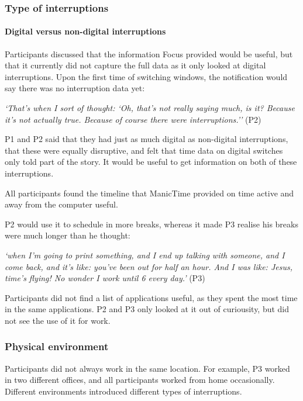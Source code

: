 \subsubsection{Type of interruptions}
\paragraph{Digital versus non-digital interruptions}

Participants discussed that the information Focus provided would be useful, but that it currently did not capture the full data as it only looked at digital interruptions. Upon the first time of switching windows, the notification would say there was no interruption data yet: 

\textit{`That's when I sort of thought: `Oh, that's not really saying much, is it? Because it's not actually true. Because of course there were interruptions.''} (P2)

P1 and P2 said that they had just as much digital as non-digital interruptions, that these were equally disruptive, and felt that time data on digital switches only told part of the story. It would be useful to get information on both of these interruptions.

All participants found the timeline that ManicTime provided on time active and away from the computer useful.

P2 would use it to schedule in more breaks, whereas it made P3 realise his breaks were much longer than he thought:

\textit{`when I'm going to print something, and I end up talking with someone, and I come back, and it's like: you've been out for half an hour. And I was like: Jesus, time's flying! No wonder I work until 6 every day.'} (P3)

Participants did not find a list of applications useful, as they spent the most time in the same applications. P2 and P3 only looked at it out of curiousity, but did not see the use of it for work. 

\subsubsection{Physical environment}
Participants did not always work in the same location. For example, P3 worked in two different offices, and all participants worked from home occasionally. Different environments introduced different types of interruptions. 

